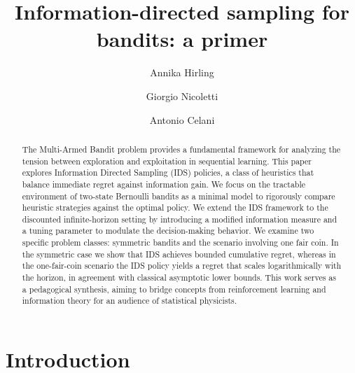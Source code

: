\documentclass[aps,nofootinbib,groupaddress,superscriptaddress,reprint,amsmath,amssymb,graphicx,onecolumn,prx]{revtex4-2}
\begin{document}

\title{Information-directed sampling for bandits: a primer}

\author{Annika Hirling}
\author{Giorgio Nicoletti}

\author{Antonio Celani}

\begin{abstract}
\noindent The Multi-Armed Bandit problem provides a fundamental framework for analyzing the tension between exploration and exploitation in sequential learning. This paper explores Information Directed Sampling (IDS) policies, a class of heuristics that balance immediate regret against information gain. We focus on the tractable environment of two-state Bernoulli bandits as a minimal model to rigorously compare heuristic strategies against the optimal policy. We extend the IDS framework to the discounted infinite-horizon setting by introducing a modified information measure and a tuning parameter to modulate the decision-making behavior. We examine two specific problem classes: symmetric bandits and the scenario involving one fair coin. In the symmetric case we show that IDS achieves bounded cumulative regret, whereas in the one-fair-coin scenario the IDS policy yields a regret that scales logarithmically with the horizon, in agreement with classical asymptotic lower bounds. This work serves as a pedagogical synthesis, aiming to bridge concepts from reinforcement learning and information theory for an audience of statistical physicists.
\end{abstract}

\maketitle

\section{Introduction}
\end{document}
